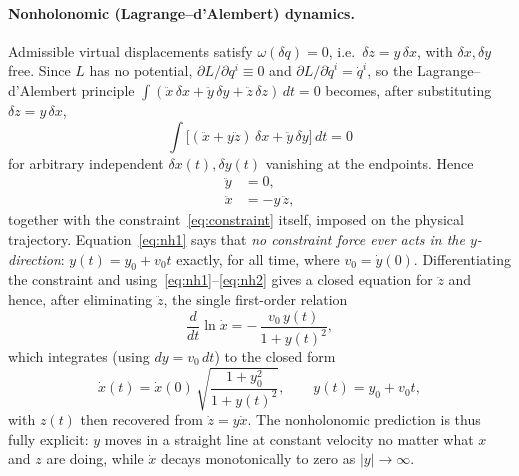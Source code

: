 \documentclass[11pt]{article}
\begin{document}
\paragraph{Nonholonomic (Lagrange--d'Alembert) dynamics.}
Admissible virtual displacements satisfy $\omega(\delta q)=0$, i.e.\ $\delta z = y\,\delta x$, with $\delta x,\delta y$ free. Since $L$ has no potential, $\partial L/\partial q^i \equiv 0$ and $\partial L/\partial \dot q^i = \dot q^i$, so the Lagrange--d'Alembert principle $\int (\ddot x\,\delta x+\ddot y\,\delta y+\ddot z\,\delta z)\,dt = 0$ becomes, after substituting $\delta z = y\,\delta x$,
\begin{equation}
\int \big[(\ddot x + y\ddot z)\,\delta x + \ddot y\,\delta y\big]\,dt = 0
\end{equation}
for arbitrary independent $\delta x(t),\delta y(t)$ vanishing at the endpoints. Hence
\begin{align}
\ddot y &= 0, \label{eq:nh1}\\
\ddot x &= -y\,\ddot z , \label{eq:nh2}
\end{align}
together with the constraint~\eqref{eq:constraint} itself, imposed on the physical trajectory. Equation~\eqref{eq:nh1} says that \emph{no constraint force ever acts in the $y$-direction}: $y(t) = y_0 + v_0 t$ exactly, for all time, where $v_0 = \dot y(0)$. Differentiating the constraint and using~\eqref{eq:nh1}--\eqref{eq:nh2} gives a closed equation for $\ddot z$ and hence, after eliminating $\ddot z$, the single first-order relation
\begin{equation}
\frac{d}{dt}\ln \dot x = -\,\frac{v_0\, y(t)}{1+y(t)^2},
\end{equation}
which integrates (using $dy = v_0\,dt$) to the closed form
\begin{equation}
\label{eq:nh-solution}
\dot x(t) = \dot x(0)\,\sqrt{\frac{1+y_0^2}{1+y(t)^2}}, \qquad y(t) = y_0 + v_0 t ,
\end{equation}
with $z(t)$ then recovered from $\dot z = y\dot x$. The nonholonomic prediction is thus fully explicit: $y$ moves in a straight line at constant velocity no matter what $x$ and $z$ are doing, while $\dot x$ decays monotonically to zero as $|y|\to\infty$.
\end{document}
